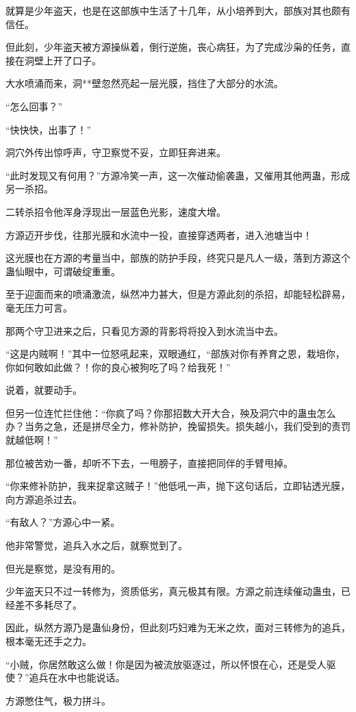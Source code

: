 \begin{this_body}
就算是少年盗天，也是在这部族中生活了十几年，从小培养到大，部族对其也颇有信任。

但此刻，少年盗天被方源操纵着，倒行逆施，丧心病狂，为了完成沙枭的任务，直接在洞壁上开了口子。

大水喷涌而来，洞**壁忽然亮起一层光膜，挡住了大部分的水流。

“怎么回事？”

“快快快，出事了！”

洞穴外传出惊呼声，守卫察觉不妥，立即狂奔进来。

“此时发现又有何用？”方源冷笑一声，这一次催动偷袭蛊，又催用其他两蛊，形成另一杀招。

二转杀招令他浑身浮现出一层蓝色光影，速度大增。

方源迈开步伐，往那光膜和水流中一投，直接穿透两者，进入池塘当中！

这光膜也在方源的考量当中，部族的防护手段，终究只是凡人一级，落到方源这个蛊仙眼中，可谓破绽重重。

至于迎面而来的喷涌激流，纵然冲力甚大，但是方源此刻的杀招，却能轻松辟易，毫无压力可言。

那两个守卫进来之后，只看见方源的背影将将投入到水流当中去。

“这是内贼啊！”其中一位怒吼起来，双眼通红，“部族对你有养育之恩，栽培你，你如何敢如此做？！你的良心被狗吃了吗？给我死！”

说着，就要动手。

但另一位连忙拦住他：“你疯了吗？你那招数大开大合，殃及洞穴中的蛊虫怎么办？当务之急，还是拼尽全力，修补防护，挽留损失。损失越小，我们受到的责罚就越低啊！”

那位被苦劝一番，却听不下去，一甩膀子，直接把同伴的手臂甩掉。

“你来修补防护，我来捉拿这贼子！”他低吼一声，抛下这句话后，立即钻透光膜，向方源追杀过去。

“有敌人？”方源心中一紧。

他非常警觉，追兵入水之后，就察觉到了。

但光是察觉，是没有用的。

少年盗天只不过一转修为，资质低劣，真元极其有限。方源之前连续催动蛊虫，已经差不多耗尽了。

因此，纵然方源乃是蛊仙身份，但此刻巧妇难为无米之炊，面对三转修为的追兵，根本毫无还手之力。

“小贼，你居然敢这么做！你是因为被流放驱逐过，所以怀恨在心，还是受人驱使？”追兵在水中也能说话。

方源憋住气，极力拼斗。


\end{this_body}
